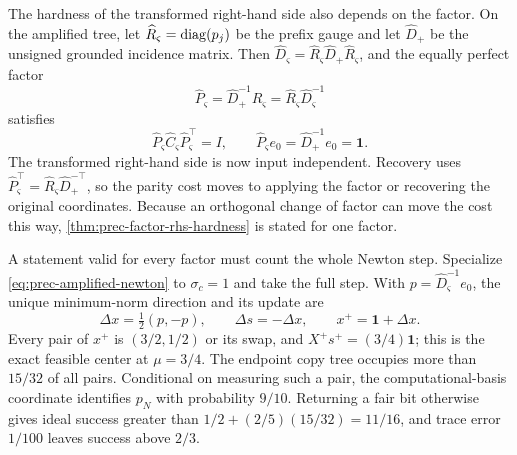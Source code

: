 The hardness of the transformed right-hand side also depends on the factor.  On the amplified tree, let $\widehat R_\varsigma=\operatorname{diag}(p_j)$ be the prefix gauge and let
$\widehat D_+$ be the unsigned grounded incidence matrix.  Then
$\widehat D_\varsigma=\widehat R_\varsigma\widehat D_+
\widehat R_\varsigma$, and the equally perfect factor
\begin{equation}
 \widehat P_\varsigma=\widehat D_+^{-1}\widehat R_\varsigma
 =\widehat R_\varsigma\widehat D_\varsigma^{-1}
 \label{eq:prec-orthogonal-loophole}
\end{equation}
satisfies
\begin{equation}
 \widehat P_\varsigma\widehat C_\varsigma\widehat P_\varsigma^\top=I,
 \qquad
 \widehat P_\varsigma e_0=\widehat D_+^{-1}e_0=\mathbf1.
 \label{eq:prec-easy-rhs}
\end{equation}
The transformed right-hand side is now input independent.  Recovery uses
$\widehat P_\varsigma^\top=\widehat R_\varsigma\widehat D_+^{-\top}$, so the parity
cost moves to applying the factor or recovering the original coordinates.
Because an orthogonal change of factor can move the cost this way,
\cref{thm:prec-factor-rhs-hardness} is stated for one factor.

A statement valid for every factor must count the whole Newton step.  Specialize
\eqref{eq:prec-amplified-newton} to $\sigma_c=1$ and take the full step.  With
$p=\widehat D_\varsigma^{-1}e_0$, the unique minimum-norm direction and its
update are
\begin{equation}
 \Delta x=\tfrac12(p,-p),\qquad \Delta s=-\Delta x,\qquad
 x^+=\mathbf1+\Delta x.                                  \label{eq:prec-hard-update}
\end{equation}
Every pair of $x^+$ is $(3/2,1/2)$ or its swap, and
$X^+s^+=(3/4)\mathbf1$; this is the exact feasible center at $\mu=3/4$.
The endpoint copy tree occupies more than $15/32$ of all pairs.  Conditional
on measuring such a pair, the computational-basis coordinate identifies
$p_N$ with probability $9/10$.  Returning a fair bit otherwise gives ideal
success greater than $1/2+(2/5)(15/32)=11/16$, and trace error $1/100$
leaves success above $2/3$.

